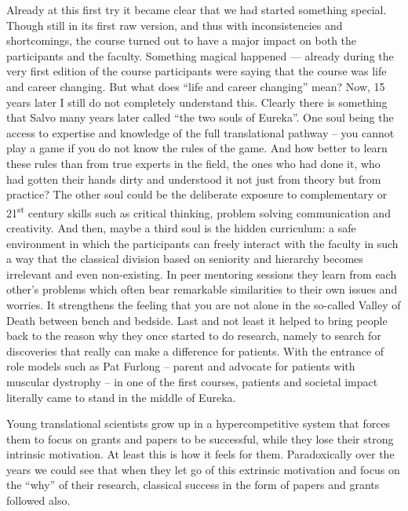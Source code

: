 \documentclass[authordate, editorial]{jote-new-article}
\begin{document}
	Already at this first try it became clear that we had started something special. Though still in its first raw version, and thus with inconsistencies and shortcomings, the course turned out to have a major impact on both the participants and the faculty. Something magical happened — already during the very first edition of the course participants were saying that the course was life and career changing. But what does “life and career changing” mean? Now, 15 years later I still do not completely understand this. Clearly there is something that Salvo many years later called “the two souls of Eureka”. One soul being the access to expertise and knowledge of the full translational pathway -- you cannot play a game if you do not know the rules of the game. And how better to learn these rules than from true experts in the field, the ones who had done it, who had gotten their hands dirty and understood it not just from theory but from practice? The other soul could be the deliberate exposure to complementary or 21\textsuperscript{st} century skills such as critical thinking, problem solving communication and creativity. And then, maybe a third soul is the hidden curriculum: a safe environment in which the participants can freely interact with the faculty in such a way that the classical division based on seniority and hierarchy becomes irrelevant and even non-existing. In peer mentoring sessions they learn from each other's problems which often bear remarkable similarities to their own issues and worries. It strengthens the feeling that you are not alone in the so-called Valley of Death between bench and bedside. Last and not least it helped to bring people back to the reason why they once started to do research, namely to search for discoveries that really can make a difference for patients. With the entrance of role models such as Pat Furlong -- parent and advocate for patients with muscular dystrophy -- in one of the first courses, patients and societal impact literally came to stand in the middle of Eureka.



	Young translational scientists grow up in a hypercompetitive system that forces them to focus on grants and papers to be successful, while they lose their strong intrinsic motivation. At least this is how it feels for them. Paradoxically over the years we could see that when they let go of this extrinsic motivation and focus on the “why” of their research, classical success in the form of papers and grants followed also.
\end{document}
